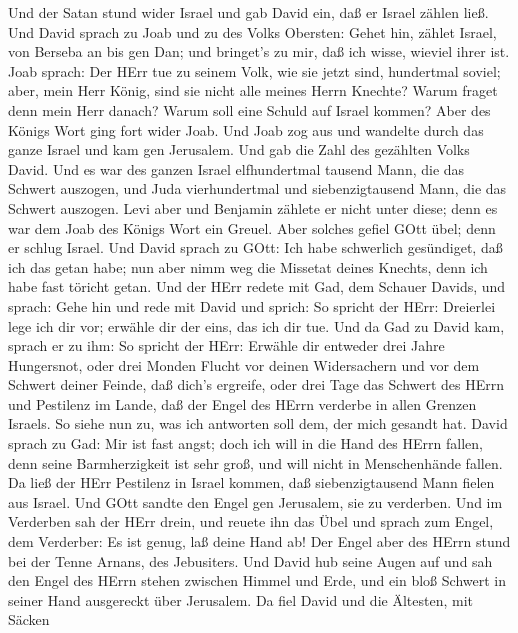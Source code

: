  Und der Satan stund wider Israel und gab David ein, daß er
Israel zählen ließ.  Und David sprach zu Joab und zu des
Volks Obersten: Gehet hin, zählet Israel, von Berseba an bis gen Dan;
und bringet's zu mir, daß ich wisse, wieviel ihrer ist. 
Joab sprach: Der HErr tue zu seinem Volk, wie sie jetzt sind, hundertmal
soviel; aber, mein Herr König, sind sie nicht alle meines Herrn Knechte?
Warum fraget denn mein Herr danach? Warum soll eine Schuld auf Israel
kommen?  Aber des Königs Wort ging fort wider Joab. Und Joab
zog aus und wandelte durch das ganze Israel und kam gen Jerusalem.
 Und gab die Zahl des gezählten Volks David. Und es war des
ganzen Israel elfhundertmal tausend Mann, die das Schwert auszogen, und
Juda vierhundertmal und siebenzigtausend Mann, die das Schwert auszogen.
 Levi aber und Benjamin zählete er nicht unter diese; denn
es war dem Joab des Königs Wort ein Greuel.  Aber solches
gefiel GOtt übel; denn er schlug Israel.  Und David sprach
zu GOtt: Ich habe schwerlich gesündiget, daß ich das getan habe; nun
aber nimm weg die Missetat deines Knechts, denn ich habe fast töricht
getan.  Und der HErr redete mit Gad, dem Schauer Davids, und
sprach:  Gehe hin und rede mit David und sprich: So spricht
der HErr: Dreierlei lege ich dir vor; erwähle dir der eins, das ich dir
tue.  Und da Gad zu David kam, sprach er zu ihm: So spricht
der HErr: Erwähle dir  entweder drei Jahre Hungersnot, oder
drei Monden Flucht vor deinen Widersachern und vor dem Schwert deiner
Feinde, daß dich's ergreife, oder drei Tage das Schwert des HErrn und
Pestilenz im Lande, daß der Engel des HErrn verderbe in allen Grenzen
Israels. So siehe nun zu, was ich antworten soll dem, der mich gesandt
hat.  David sprach zu Gad: Mir ist fast angst; doch ich
will in die Hand des HErrn fallen, denn seine Barmherzigkeit ist sehr
groß, und will nicht in Menschenhände fallen.  Da ließ der
HErr Pestilenz in Israel kommen, daß siebenzigtausend Mann fielen aus
Israel.  Und GOtt sandte den Engel gen Jerusalem, sie zu
verderben. Und im Verderben sah der HErr drein, und reuete ihn das Übel
und sprach zum Engel, dem Verderber: Es ist genug, laß deine Hand ab!
Der Engel aber des HErrn stund bei der Tenne Arnans, des Jebusiters.
 Und David hub seine Augen auf und sah den Engel des HErrn
stehen zwischen Himmel und Erde, und ein bloß Schwert in seiner Hand
ausgereckt über Jerusalem. Da fiel David und die Ältesten, mit Säcken
